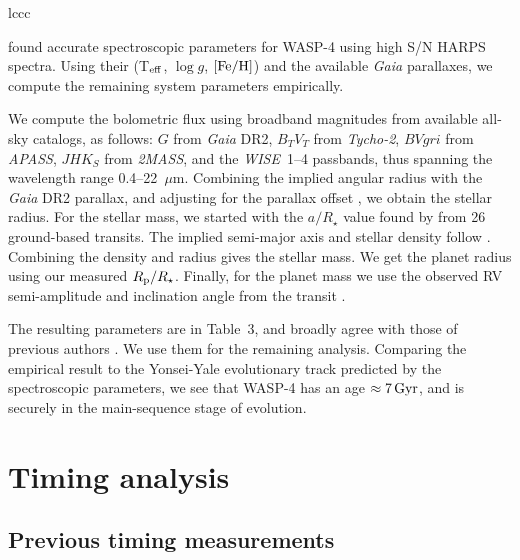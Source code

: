 \documentclass[12pt,twocolumn,tighten]{aastex62}
\begin{document}
\begin{deluxetable}{lccc}

\end{deluxetable}

\citet{doyle_accurate_2013} found accurate spectroscopic parameters
for WASP-4 using high S/N HARPS spectra.  Using their (T$_{\rm eff}$,
$\log g$, $[{\rm Fe/H}]$) and the available {\it Gaia} parallaxes, we
compute the remaining system parameters empirically.

We compute the bolometric flux using broadband magnitudes from
available all-sky catalogs, as follows: $G$ from {\it Gaia\/} DR2,
$B_T V_T$ from {\it Tycho-2}, $BVgri$ from {\it APASS}, $JHK_S$ from {\it
2MASS}, and the {\it WISE}~1--4 passbands, thus spanning the
wavelength range 0.4--22~$\mu$m.  Combining the implied angular radius
with the {\it Gaia} DR2 parallax, and adjusting for the parallax
offset \citep{stassun_evidence_2018}, we obtain the stellar radius.
For the stellar mass, we started with the $a/R_\star$ value found by
\citet{hoyer_tramos_2013} from 26 ground-based transits.  The implied
semi-major axis and stellar density follow \citep{seager_unique_2003}.
Combining the density and radius gives the stellar mass.  We get the
planet radius using our measured $R_{\rm p}/R_\star$.  Finally, for
the planet mass we use the observed RV semi-amplitude and inclination
angle from the transit
\citep{triaud_spin-orbit_2010,hoyer_tramos_2013}.

The resulting parameters are in Table~3, and broadly agree with those
of previous authors
\citep{wilson_wasp-4b_2008,gillon_discovery_2009,winn_transit_2009,southworth_homogeneous_2011,petrucci_no_2013}.
We use them for the remaining analysis.  Comparing the empirical
result to the Yonsei-Yale evolutionary track predicted by the
spectroscopic parameters, we see that WASP-4  has an age $\approx
7\,{\rm Gyr}$, and is securely in the main-sequence stage of
evolution.

\section{Timing analysis}
\label{sec:timing}

\subsection{Previous timing measurements}
\label{subsec:times}
\end{document}
